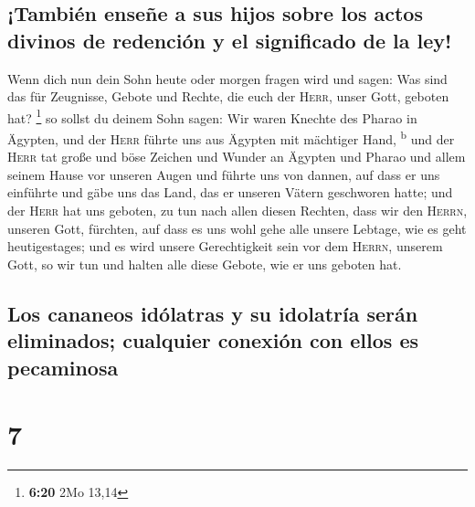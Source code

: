 \hypertarget{tambiuxe9n-enseuxf1e-a-sus-hijos-sobre-los-actos-divinos-de-redenciuxf3n-y-el-significado-de-la-ley}{%
\subsection{¡También enseñe a sus hijos sobre los actos divinos de
redención y el significado de la
ley!}\label{tambiuxe9n-enseuxf1e-a-sus-hijos-sobre-los-actos-divinos-de-redenciuxf3n-y-el-significado-de-la-ley}}

 Wenn dich nun dein Sohn heute oder morgen fragen wird
und sagen: Was sind das für Zeugnisse, Gebote und Rechte, die euch der
\textsc{Herr}, unser Gott, geboten hat? \footnote{\textbf{6:20} 2Mo
  13,14}  so sollst du deinem Sohn sagen: Wir waren
Knechte des Pharao in Ägypten, und der \textsc{Herr} führte uns aus
Ägypten mit mächtiger Hand, \textsuperscript{b}  und der
\textsc{Herr} tat große und böse Zeichen und Wunder an Ägypten und
Pharao und allem seinem Hause vor unseren Augen  und
führte uns von dannen, auf dass er uns einführte und gäbe uns das Land,
das er unseren Vätern geschworen hatte;  und der
\textsc{Herr} hat uns geboten, zu tun nach allen diesen Rechten, dass
wir den \textsc{Herrn}, unseren Gott, fürchten, auf dass es uns wohl
gehe alle unsere Lebtage, wie es geht heutigestages;  und
es wird unsere Gerechtigkeit sein vor dem \textsc{Herrn}, unserem Gott,
so wir tun und halten alle diese Gebote, wie er uns geboten hat.

\hypertarget{los-cananeos-iduxf3latras-y-su-idolatruxeda-seruxe1n-eliminados-cualquier-conexiuxf3n-con-ellos-es-pecaminosa}{%
\subsection{Los cananeos idólatras y su idolatría serán eliminados;
cualquier conexión con ellos es
pecaminosa}\label{los-cananeos-iduxf3latras-y-su-idolatruxeda-seruxe1n-eliminados-cualquier-conexiuxf3n-con-ellos-es-pecaminosa}}

\hypertarget{section-6}{%
\section{7}\label{section-6}}

